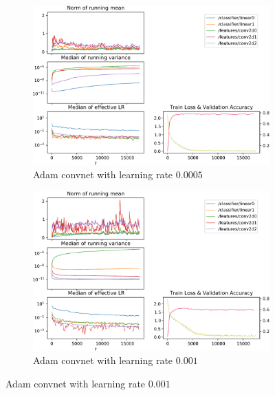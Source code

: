 \begin{figure}
    \begin{subfigure}{\textwidth}
        \centering
        \includegraphics[width=\linewidth]{gfx/diagrams/experiments/adam/adammodel_adam_00005_0_-1.pdf}
        \caption{Adam convnet with learning rate $0.0005$}
    \end{subfigure}

    \begin{subfigure}{\textwidth}
        \centering
        \includegraphics[width=\linewidth]{gfx/diagrams/experiments/adam/adammodel_adam_0001_0_-1.pdf}
        \caption{Adam convnet with learning rate $0.001$}
    \end{subfigure}


\end{figure}
